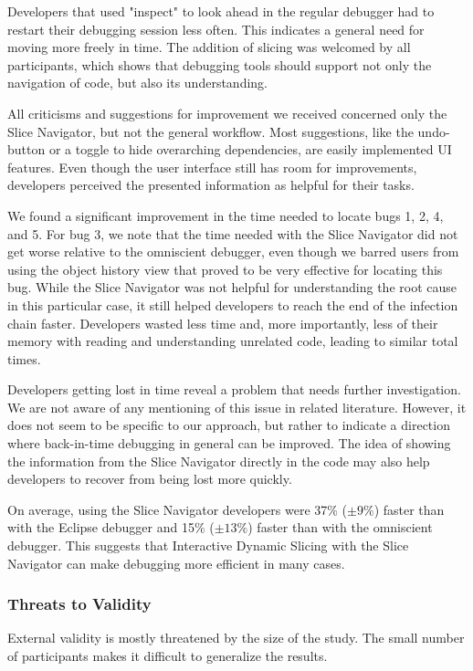 \documentclass[
			english,
			]{elsarticle}
\begin{document}
Developers that used "inspect" to look ahead in the regular debugger had to restart their debugging session less often.
This indicates a general need for moving more freely in time.
The addition of slicing was welcomed by all participants, which shows that debugging tools should support not only the navigation of code, but also its understanding.

All criticisms and suggestions for improvement we received concerned only the Slice Navigator, but not the general workflow.
Most suggestions, like the undo-button or a toggle to hide overarching dependencies, are easily implemented UI features.
Even though the user interface still has room for improvements, developers perceived the presented information as helpful for their tasks.

We found a significant improvement in the time needed to locate bugs 1, 2, 4, and 5.
For bug 3, we note that the time needed with the Slice Navigator did not get worse relative to the omniscient debugger, even though we barred users from using the object history view that proved to be very effective for locating this bug.
While the Slice Navigator was not helpful for understanding the root cause in this particular case, it still helped developers to reach the end of the infection chain faster.
Developers wasted less time and, more importantly, less of their memory with reading and understanding unrelated code, leading to similar total times.

Developers getting lost in time reveal a problem that needs further investigation. 
We are not aware of any mentioning of this issue in related literature.
However, it does not seem to be specific to our approach, but rather to indicate a direction where back-in-time debugging in general can be improved.
The idea of showing the information from the Slice Navigator directly in the code may also help developers to recover from being lost more quickly.

On average, using the Slice Navigator developers were 37\% ($\pm9\%$) faster than with the Eclipse debugger and 15\% ($\pm13\%$) faster than with the omniscient debugger.
This suggests that Interactive Dynamic Slicing with the Slice Navigator can make debugging more efficient in many cases.

\subsubsection{Threats to Validity}

External validity is mostly threatened by the size of the study. 
The small number of participants makes it difficult to generalize the results.
\end{document}
